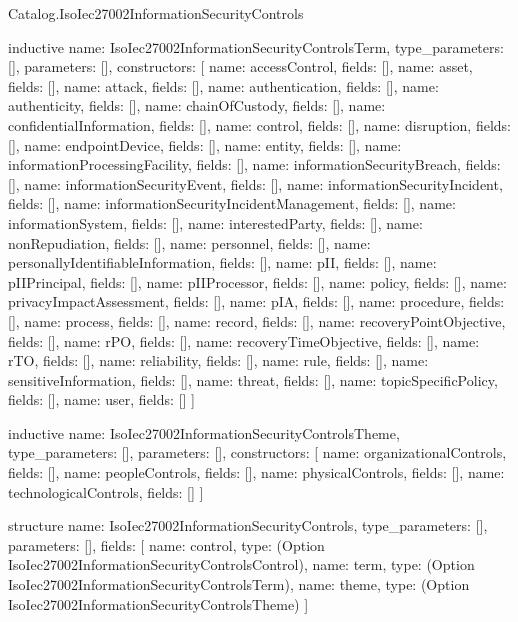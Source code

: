 \begin{lexlean}{Catalog.IsoIec27002InformationSecurityControls}
\begin{semanticmodule}
inductive{
  name: IsoIec27002InformationSecurityControlsTerm,
  type_parameters: [],
  parameters: [],
  constructors: [
    {name: accessControl, fields: []},
    {name: asset, fields: []},
    {name: attack, fields: []},
    {name: authentication, fields: []},
    {name: authenticity, fields: []},
    {name: chainOfCustody, fields: []},
    {name: confidentialInformation, fields: []},
    {name: control, fields: []},
    {name: disruption, fields: []},
    {name: endpointDevice, fields: []},
    {name: entity, fields: []},
    {name: informationProcessingFacility, fields: []},
    {name: informationSecurityBreach, fields: []},
    {name: informationSecurityEvent, fields: []},
    {name: informationSecurityIncident, fields: []},
    {name: informationSecurityIncidentManagement, fields: []},
    {name: informationSystem, fields: []},
    {name: interestedParty, fields: []},
    {name: nonRepudiation, fields: []},
    {name: personnel, fields: []},
    {name: personallyIdentifiableInformation, fields: []},
    {name: pII, fields: []},
    {name: pIIPrincipal, fields: []},
    {name: pIIProcessor, fields: []},
    {name: policy, fields: []},
    {name: privacyImpactAssessment, fields: []},
    {name: pIA, fields: []},
    {name: procedure, fields: []},
    {name: process, fields: []},
    {name: record, fields: []},
    {name: recoveryPointObjective, fields: []},
    {name: rPO, fields: []},
    {name: recoveryTimeObjective, fields: []},
    {name: rTO, fields: []},
    {name: reliability, fields: []},
    {name: rule, fields: []},
    {name: sensitiveInformation, fields: []},
    {name: threat, fields: []},
    {name: topicSpecificPolicy, fields: []},
    {name: user, fields: []}
  ]
}

inductive{
  name: IsoIec27002InformationSecurityControlsTheme,
  type_parameters: [],
  parameters: [],
  constructors: [
    {name: organizationalControls, fields: []},
    {name: peopleControls, fields: []},
    {name: physicalControls, fields: []},
    {name: technologicalControls, fields: []}
  ]
}

structure{
  name: IsoIec27002InformationSecurityControls,
  type_parameters: [],
  parameters: [],
  fields: [
    {name: control, type: (Option IsoIec27002InformationSecurityControlsControl)},
    {name: term, type: (Option IsoIec27002InformationSecurityControlsTerm)},
    {name: theme, type: (Option IsoIec27002InformationSecurityControlsTheme)}
  ]
}
\end{semanticmodule}
\end{lexlean}
